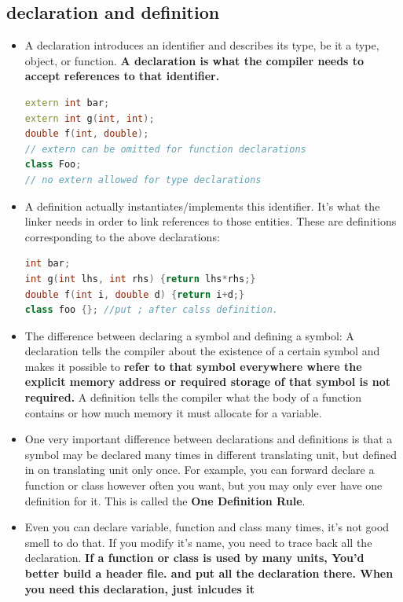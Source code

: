 \documentclass[a4paper,12pt,twoside]{book}
\begin{document}
\subsection{declaration and definition}
\begin{itemize}
	\item A declaration introduces an identifier and describes its type, be it a type, object, or function. \textbf{A declaration is what the compiler needs to accept references to that identifier.} 
	
\begin{lstlisting}[frame=single, language=c++]
extern int bar;
extern int g(int, int);
double f(int, double); 
// extern can be omitted for function declarations
class Foo; 
// no extern allowed for type declarations
	\end{lstlisting}
	
	\item A definition actually instantiates/implements this identifier. It's what the linker needs in order to link references to those entities. These are definitions corresponding to the above declarations:

\begin{lstlisting}[frame=single, language=c++]
int bar;
int g(int lhs, int rhs) {return lhs*rhs;}
double f(int i, double d) {return i+d;}
class foo {}; //put ; after calss definition.
\end{lstlisting}
	
	\item The difference between declaring a symbol and defining a symbol: A declaration tells the compiler about the existence of a certain symbol and makes it possible to \textbf{refer to that symbol everywhere where the explicit memory address or required storage of that symbol is not required.}  A definition tells the compiler what the body of a function contains or how much memory it must allocate for a variable.
	
	\item One very important difference between declarations and definitions is that a symbol may be declared many times in different translating unit, but defined in on translating unit only once. For example, you can forward declare a function or class however often you want, but you may only ever have one definition for it. This is called the \textbf{One Definition Rule}.
	
	\item Even you can declare variable, function and class many times, it's not good smell to do that.  If you modify it's name, you need to trace back all the declaration. \textbf{If a function or class is used by many units, You'd better build a header file. and put all the declaration there. When you need this declaration, just inlcudes it} 
\end{itemize}
\end{document}
